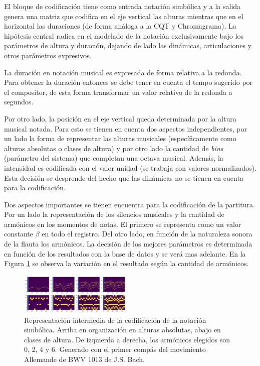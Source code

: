 \documentclass
  [ams,pdfout]%
	{aeslac}
\begin{document}
El bloque de codificación tiene como entrada notación simbólica y a la salida genera una matriz que codifica en el eje vertical las alturas mientras que en el horizontal las duraciones (de forma análoga a la CQT y Chromagrama). La hipótesis central radica en el modelado de la notación exclusivamente bajo los parámetros de altura y duración, dejando de lado las dinámicas, articulaciones y otros parámetros expresivos. 

La duración en notación musical es expresada de forma relativa a la redonda. Para obtener la duración entonces se debe tener en cuenta el tempo sugerido por el compositor, de esta forma transformar un valor relativo de la redonda a segundos.  

Por otro lado, la posición en el eje vertical queda determinada por la altura musical notada. Para esto se tienen en cuenta dos aspectos independientes, por un lado la forma de representar las alturas musicales (específicamente como alturas absolutas o clases de altura) y por otro lado la cantidad de \textit{bins} (parámetro del sistema) que completan una octava musical. Además, la intensidad es codificada con el valor unidad (se trabaja con valores normalizados). Esta decisión se desprende del hecho que las dinámicas no se tienen en cuenta para la codificación. 

Dos aspectos importantes se tienen encuentra para la codificación de la partitura. Por un lado la representación de los silencios musicales y la cantidad de armónicos en los momentos de notas. El primero se representa como un valor constante $\beta$ en todo el registro. Del otro lado, en función de la naturaleza sonora de la flauta los armónicos. La decisión de los mejores parámetros es determinada en función de los resultados con la base de datos y se verá mas adelante. En la Figura \ref{fig:armonicos_param} se observa la variación en el resultado según la cantidad de armónicos.

\begin{figure}[h!]
\begin{center}
\includegraphics[width=0.48\textwidth]{imagenes/armonicos_param} 	
\caption{Representación intermedia de la codificación de la notación simbólica. Arriba en organización en alturas absolutas, abajo en clases de altura. De izquierda a derecha, los armónicos elegidos son 0, 2, 4 y 6. Generado con el primer compás del movimiento Allemande de BWV 1013 de J.S. Bach.}
\label{fig:armonicos_param}
\end{center}
\end{figure}
\end{document}
